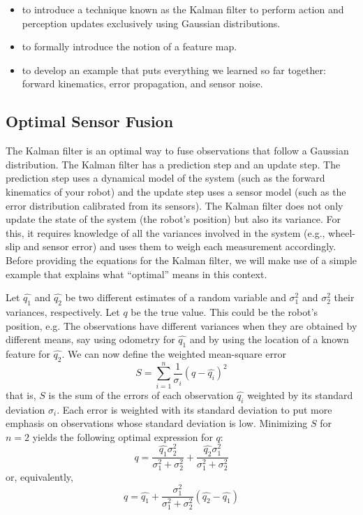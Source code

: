 \begin{itemize}
\item to introduce a technique known as the Kalman filter to perform action and perception updates exclusively using Gaussian distributions.
\item to formally introduce the notion of a feature map.
\item to develop an example that puts everything we learned so far together: forward kinematics, error propagation, and sensor noise.
\end{itemize}

\subsection{Optimal Sensor Fusion}
The Kalman filter is an optimal way to fuse observations that follow a Gaussian distribution. The Kalman filter has a prediction step and an update step. The prediction step uses a dynamical model of the system (such as the forward kinematics of your robot) and the update step uses a sensor model (such as the error distribution calibrated from its sensors). The Kalman filter does not only update the state of the system (the robot's position) but also its variance. For this, it requires knowledge of all the variances involved in the system (e.g., wheel-slip and sensor error) and uses them to weigh each measurement accordingly. Before providing the equations for the Kalman filter, we will make use of a simple example that explains what ``optimal'' means in this context.

 Let $ \hat{q_1}$ and $ \hat{q_2}$ be two different estimates of a random variable and $ \sigma^2_1$ and $ \sigma^2_2$ their variances, respectively. Let $ q$ be the true value. This could be the robot's position, e.g. The observations have different variances when they are obtained by  different means, say using odometry for $ \hat{q_1}$ and by using the location of a known feature for $ \hat{q_2}$. We can now define the weighted mean-square error
 \begin{equation}
S=\displaystyle\sum_{i=1}^{n}\frac{1}{\sigma_i} (q-\hat{q_i})^2
\end{equation}
that is, $ S$ is the sum of the errors of each observation $ \hat{q_i}$ weighted by its standard deviation $ \sigma_i$. Each error is weighted  with its standard deviation to put more emphasis on observations whose standard deviation is low. Minimizing  $S$ for $n=2$ yields the following optimal expression for $q$:
\begin{equation}
q=\frac{\hat{q_1}\sigma_2^2}{\sigma_1^2+\sigma_2^2}+\frac{\hat{q_2}\sigma_1^2}{\sigma_1^2+\sigma_2^2}
\end{equation}
or, equivalently,
\begin{equation}
q=\hat{q_1}+\frac{\sigma_1^2}{\sigma_1^2+\sigma_2^2}(\hat{q_2}-\hat{q_1})\label{eq:optimalfusion}
\end{equation}

